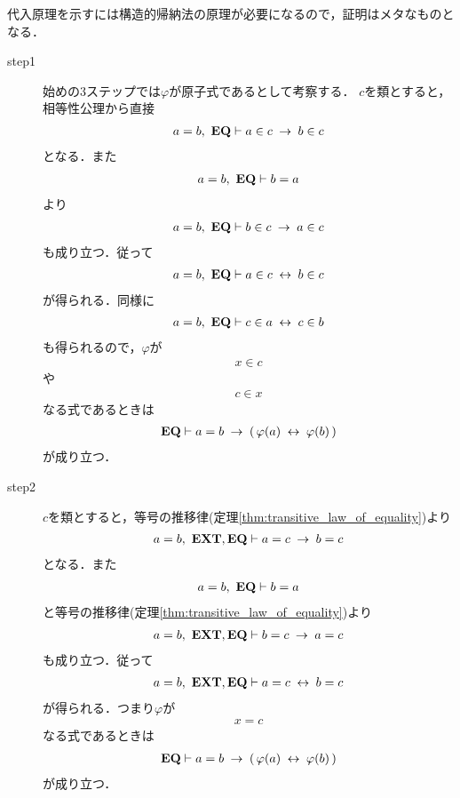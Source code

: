 	代入原理を示すには構造的帰納法の原理が必要になるので，証明はメタなものとなる．
	
	\begin{sketch}\mbox{}
		\begin{description}
			\item[step1]
				始めの$3$ステップでは$\varphi$が原子式であるとして考察する．
				$c$を類とすると，相等性公理から直接
				\begin{align}
					a = b,\ \mbox{{\bf EQ}} \vdash a \in c \hspace{0.25em}\rightarrow\hspace{0.25em} b \in c
				\end{align}
				となる．また
				\begin{align}
					a = b,\ \mbox{{\bf EQ}} \vdash b = a
				\end{align}
				より
				\begin{align}
					a = b,\ \mbox{{\bf EQ}} \vdash b \in c \hspace{0.25em}\rightarrow\hspace{0.25em} a \in c
				\end{align}
				も成り立つ．従って
				\begin{align}
					a = b,\ \mbox{{\bf EQ}} \vdash a \in c \hspace{0.25em}\leftrightarrow\hspace{0.25em} b \in c
				\end{align}
				が得られる．同様に
				\begin{align}
					a = b,\ \mbox{{\bf EQ}} \vdash c \in a \hspace{0.25em}\leftrightarrow\hspace{0.25em} c \in b
				\end{align}
				も得られるので，$\varphi$が
				\begin{align}
					x \in c
				\end{align}
				や
				\begin{align}
					c \in x
				\end{align}
				なる式であるときは
				\begin{align}
					\mbox{{\bf EQ}} \vdash a = b \hspace{0.25em}\rightarrow\hspace{0.25em} (\, \varphi(a) \hspace{0.25em}\leftrightarrow\hspace{0.25em} \varphi(b)\, )
				\end{align}
				が成り立つ．
			
			\item[step2]
				$c$を類とすると，等号の推移律(定理\ref{thm:transitive_law_of_equality})より
				\begin{align}
					a = b,\ \mbox{{\bf EXT}},\mbox{{\bf EQ}} \vdash a = c \hspace{0.25em}\rightarrow\hspace{0.25em} b = c
				\end{align}
				となる．また
				\begin{align}
					a = b,\ \mbox{{\bf EQ}} \vdash b = a
				\end{align}
				と等号の推移律(定理\ref{thm:transitive_law_of_equality})より
				\begin{align}
					a = b,\ \mbox{{\bf EXT}},\mbox{{\bf EQ}} \vdash b = c \hspace{0.25em}\rightarrow\hspace{0.25em} a = c
				\end{align}
				も成り立つ．従って
				\begin{align}
					a = b,\ \mbox{{\bf EXT}},\mbox{{\bf EQ}} \vdash a = c \hspace{0.25em}\leftrightarrow\hspace{0.25em} b = c
				\end{align}
				が得られる．つまり$\varphi$が
				\begin{align}
					x = c
				\end{align}
				なる式であるときは
				\begin{align}
					\mbox{{\bf EQ}} \vdash a = b \hspace{0.25em}\rightarrow\hspace{0.25em} (\, \varphi(a) \hspace{0.25em}\leftrightarrow\hspace{0.25em} \varphi(b)\, )
				\end{align}
				が成り立つ．
				

\end{description}
\end{sketch}
